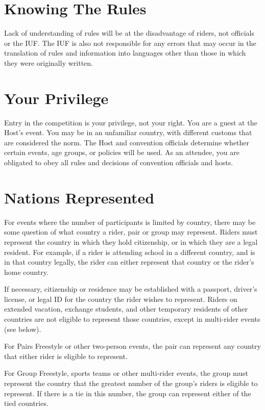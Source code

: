 \section{Knowing The Rules}
Lack of understanding of rules will be at the disadvantage of riders, not officials or the IUF.
The IUF is also not responsible for any errors that may occur in the translation of rules and information into languages other than those in which they were originally written.

\section{Your Privilege}
Entry in the competition is your privilege, not your right.
You are a guest at the Host's event.
You may be in an unfamiliar country, with different customs that are considered the norm.
The Host and convention officials determine whether certain events, age groups, or policies will be used.
As an attendee, you are obligated to obey all rules and decisions of convention officials and hosts.

\section{Nations Represented}
For events where the number of participants is limited by country, there may be some question of what country a rider, pair or group may represent.
Riders must represent the country in which they hold citizenship, or in which they are a legal resident.
For example, if a rider is attending school in a different country, and is in that country legally, the rider can either represent that country or the rider's home country.

If necessary, citizenship or residence may be established with a passport, driver's license, or legal ID for the country the rider wishes to represent.
Riders on extended vacation, exchange students, and other temporary residents of other countries are not eligible to represent those countries, except in multi-rider events (see below).

For Pairs Freestyle or other two-person events, the pair can represent any country that either rider is eligible to represent.

For Group Freestyle, sports teams or other multi-rider events, the group must represent the country that the greatest number of the group's riders is eligible to represent.
If there is a tie in this number, the group can represent either of the tied countries.

